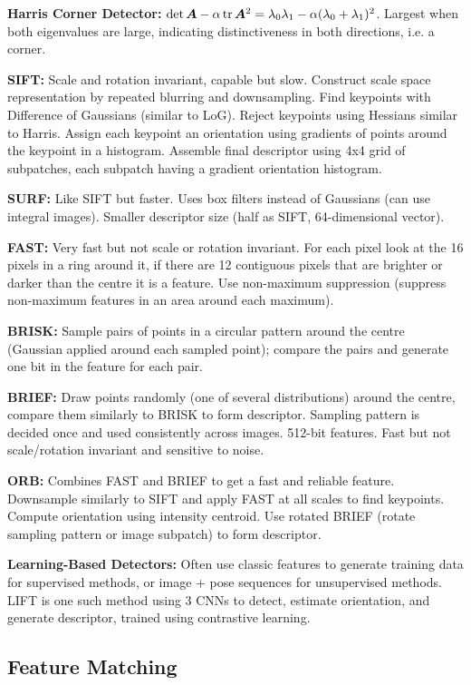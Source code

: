 \documentclass[twocolumn, 10pt]{extarticle}
\begin{document}
\textbf{Harris Corner Detector:} \(\det\bm A - \alpha\operatorname{tr}\bm A^2 = \lambda _0\lambda _1 - \alpha(\lambda _0 + \lambda _1)^2\).
Largest when both eigenvalues are large, indicating distinctiveness in both directions, i.e. a corner.

\textbf{SIFT:} Scale and rotation invariant, capable but slow. Construct scale space representation by repeated blurring
and downsampling. Find keypoints with Difference of Gaussians (similar to LoG). Reject keypoints using Hessians similar
to Harris. Assign each keypoint an orientation using gradients of points around the keypoint in a histogram. Assemble
final descriptor using 4x4 grid of subpatches, each subpatch having a gradient orientation histogram.

\textbf{SURF:} Like SIFT but faster. Uses box filters instead of Gaussians (can use integral images). Smaller descriptor
size (half as SIFT, 64-dimensional vector).

\textbf{FAST:} Very fast but not scale or rotation invariant. For each pixel look at the 16 pixels in a ring around it,
if there are 12 contiguous pixels that are brighter or darker than the centre it is a feature. Use non-maximum
suppression (suppress non-maximum features in an area around each maximum).

\textbf{BRISK:} Sample pairs of points in a circular pattern around the centre (Gaussian applied around each sampled
point); compare the pairs and generate one bit in the feature for each pair.

\textbf{BRIEF:} Draw points randomly (one of several distributions) around the centre, compare them similarly to BRISK
to form descriptor. Sampling pattern is decided once and used consistently across images. 512-bit features. Fast but not
scale/rotation invariant and sensitive to noise.

\textbf{ORB:} Combines FAST and BRIEF to get a fast and reliable feature. Downsample similarly to SIFT and apply FAST at
all scales to find keypoints. Compute orientation using intensity centroid. Use rotated BRIEF (rotate sampling pattern
or image subpatch) to form descriptor.

\textbf{Learning-Based Detectors:} Often use classic features to generate training data for supervised methods, or image
+ pose sequences for unsupervised methods. LIFT is one such method using 3 CNNs to detect, estimate orientation, and
generate descriptor, trained using contrastive learning.

\subsection{Feature Matching}
\end{document}

